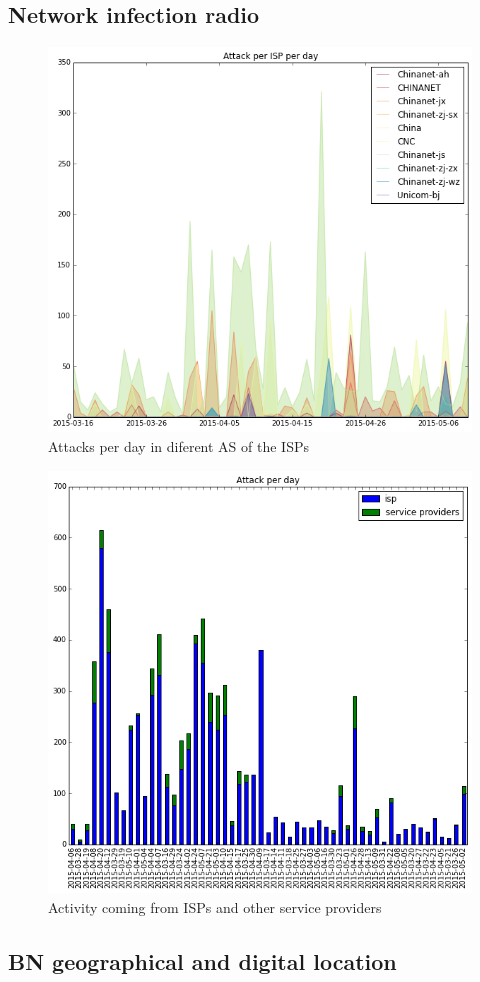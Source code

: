\subsection{Network infection radio}


\begin{figure}[h]
     \caption{Attacks per day in diferent AS of the ISPs }
     \label{fig:isp_day}
    \centering
    \includegraphics[width=\linewidth]{images/isp_legend_area}
\end{figure}


\begin{figure}[h]
    \caption{Activity coming from ISPs and other service providers}
    \label{fig:as_day}
    \centering
    \includegraphics[width=\linewidth]{images/isp_no_isp}
\end{figure}
\subsection{BN geographical and digital location}
